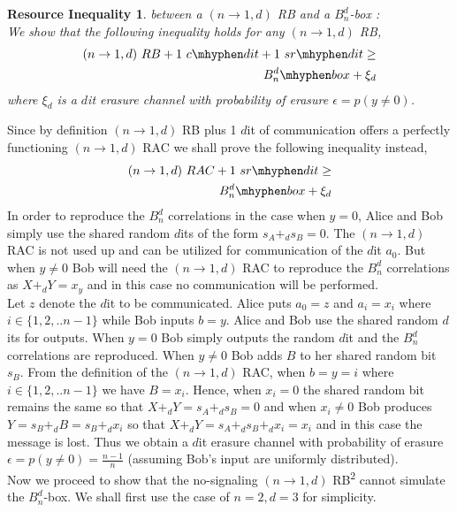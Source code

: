 \documentclass[%
 reprint,
 amsmath,amssymb,
 aps,
]{revtex4-1}
\newtheorem{mydef3}{Resource Inequality}
\begin{document}
\begin{mydef3}\label{re2}
between a $(n\rightarrow1,d)$ RB and a $B_n^d$-box : \\
We show that the following inequality holds for any $(n\rightarrow1,d)$ RB,
\begin{eqnarray} 
(n\rightarrow1,d)\ RB  +1\ c\mhyphen dit + 1\  sr\mhyphen dit \geq \nonumber \\ B_n^d\mhyphen box + \xi_d
\end{eqnarray}
where $\xi_d$ is a $d$it erasure channel with probability of erasure $\epsilon=p(y\neq 0)$. 
\end{mydef3}
Since by definition $(n\rightarrow1,d)$ RB plus 1 $d$it of communication offers a perfectly functioning $(n\rightarrow1,d)$ RAC we shall prove the following inequality instead,
\begin{eqnarray}
(n\rightarrow1,d)\ RAC + 1\  sr\mhyphen dit \geq \nonumber \\ B_n^d\mhyphen box + \xi_d
\end{eqnarray}
In order to reproduce the $B_n^d$ correlations in the case when $y=0$, Alice and Bob simply use the shared random $d$its of the form $s_A +_d s_B =0$. The $(n\rightarrow1,d)$ RAC is not used up and can be utilized for communication of the $d$it $a_0$. But when $y\neq 0$ Bob will need the $(n\rightarrow1,d)$ RAC to reproduce the $B_n^d$ correlations as $X+_d Y=x_y$ and in this case no communication will be performed. \\
Let $z$ denote the $d$it to be communicated. Alice puts $a_0=z$ and  $a_i=x_i$ where $i\in \{1,2,..n-1\}$ while Bob inputs $b=y$. Alice and Bob use the shared random $d$its for outputs. When $y=0$ Bob simply outputs the random $d$it and the $B_n^d$ correlations are reproduced. When $y\neq 0$ Bob adds $B$ to her shared random bit $s_B$. From the definition of the $(n\rightarrow 1,d)$ RAC, when $b=y=i$ where $i\in \{1,2,..n-1\}$ we have $B=x_i$. Hence, when $x_i=0$ the shared random bit remains the same so that $X+_d Y=s_A+_d s_B=0$ and when $x_i\neq 0$ Bob produces $Y=s_B+_d B=s_B+_d x_i$ so that $X+_d Y=s_A+_ds_B+_d x_i=x_i$ and in this case the message is lost. Thus we obtain a $d$it erasure channel with probability of erasure  $\epsilon=p(y\neq 0)=\frac{n-1}{n}$ (assuming Bob's input are uniformly distributed). \\
Now we proceed to show that the no-signaling $(n\rightarrow1,d)$ RB\textsuperscript{2} cannot simulate the $B^d_n$-box. We shall first use the case of $n=2,d=3$ for simplicity.\\
\end{document}
